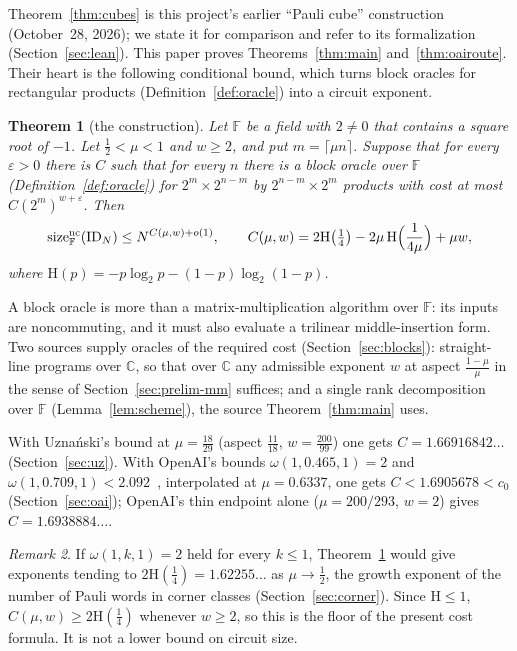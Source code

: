 \documentclass[11pt]{article}
\newtheorem{theorem}{Theorem}[section]
\theoremstyle{definition}
\theoremstyle{remark}
\newtheorem{remark}[theorem]{Remark}
\newcommand{\F}{\mathbb{F}}
\newcommand{\C}{\mathbb{C}}
\newcommand{\ID}{\mathrm{ID}}
\newcommand{\size}{\mathrm{size}^{\mathrm{nc}}}
\newcommand{\Hb}{\mathrm{H}}
\begin{document}
Theorem~\ref{thm:cubes} is this project's earlier ``Pauli cube'' construction (October~28, 2026); we state it for
comparison and refer to its formalization (Section~\ref{sec:lean}). This paper proves Theorems~\ref{thm:main}
and~\ref{thm:oairoute}. Their heart is the following conditional bound, which turns block oracles for rectangular
products (Definition~\ref{def:oracle}) into a circuit exponent.

\begin{theorem}[the construction]\label{thm:construction}
Let $\F$ be a field with $2\ne0$ that contains a square root of $-1$. Let $\tfrac12<\mu<1$ and $w\ge2$, and put
$m=\lceil\mu n\rceil$. Suppose that for every $\varepsilon>0$ there is $C$ such that for every $n$ there is a block
oracle over $\F$ (Definition~\ref{def:oracle}) for $2^m\times2^{n-m}$ by $2^{n-m}\times2^m$ products with cost at
most $C(2^m)^{w+\varepsilon}$. Then
\[
\size_\F(\ID_N)\le N^{C(\mu,w)+o(1)},\qquad
C(\mu,w)=2\Hb\bigl(\tfrac14\bigr)-2\mu\,\Hb\Bigl(\frac1{4\mu}\Bigr)+\mu w ,
\]
where $\Hb(p)=-p\log_2p-(1-p)\log_2(1-p)$.
\end{theorem}

A block oracle is more than a matrix-multiplication algorithm over $\F$: its inputs are noncommuting, and it must
also evaluate a trilinear middle-insertion form. Two sources supply oracles of the required cost
(Section~\ref{sec:blocks}): straight-line programs over $\C$, so that over $\C$ any admissible exponent $w$ at aspect
$\frac{1-\mu}{\mu}$ in the sense of Section~\ref{sec:prelim-mm} suffices; and a single rank decomposition over $\F$
(Lemma~\ref{lem:scheme}), the source Theorem~\ref{thm:main} uses.

With Uzna\'nski's bound at $\mu=\frac{18}{29}$ (aspect $\frac{11}{18}$, $w=\frac{200}{99}$) one gets
$C=1.66916842\ldots$ (Section~\ref{sec:uz}). With OpenAI's bounds $\omega(1,0.465,1)=2$ and
$\omega(1,0.709,1)<2.092$~\cite{OAI2026b}, interpolated at $\mu=0.6337$, one gets $C<1.6905678<c_0$
(Section~\ref{sec:oai}); OpenAI's thin endpoint alone ($\mu=200/293$, $w=2$) gives $C=1.6938884\ldots$.

\begin{remark}
If $\omega(1,k,1)=2$ held for every $k\le1$, Theorem~\ref{thm:construction} would give exponents tending to
$2\Hb(\tfrac14)=1.62255\ldots$ as $\mu\to\tfrac12$, the growth exponent of the number of Pauli words in corner
classes (Section~\ref{sec:corner}). Since $\Hb\le1$, $C(\mu,w)\ge2\Hb(\frac14)$ whenever $w\ge2$, so this is the
floor of the present cost formula. It is not a lower bound on circuit size.
\end{remark}
\end{document}

